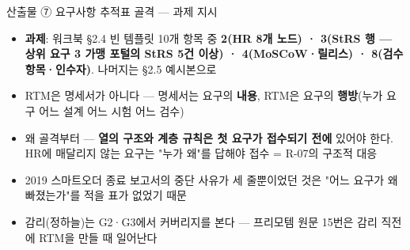 \begin{frame}{산출물 ⑦ 요구사항 추적표 골격 — 과제 지시}
\begin{itemize}
\item \textbf{과제}: 워크북 §2.4 빈 템플릿 10개 항목 중 \textbf{2(HR 8개 노드) · 3(StRS 행 — 상위 요구 3 가맹 포털의 StRS 5건 이상) · 4(MoSCoW·릴리스) · 8(검수 항목·인수자)}. 나머지는 §2.5 예시본으로
\item RTM은 명세서가 아니다 — 명세서는 요구의 \textbf{내용}, RTM은 요구의 \textbf{행방}(누가 요구 \ra{} 어느 설계 \ra{} 어느 시험 \ra{} 어느 검수)
\item 왜 골격부터 — \textbf{열의 구조와 계층 규칙은 첫 요구가 접수되기 전에} 있어야 한다. HR에 매달리지 않는 요구는 "누가 왜"를 답해야 접수 = R-07의 구조적 대응
\item 2019 스마트오더 종료 보고서의 중단 사유가 세 줄뿐이었던 것은 "어느 요구가 왜 빠졌는가"를 적을 표가 없었기 때문
\item 감리(정하늘)는 G2·G3에서 커버리지를 본다 — 프리모템 원문 15번은 감리 직전에 RTM을 만들 때 일어난다
\end{itemize}
\end{frame}

